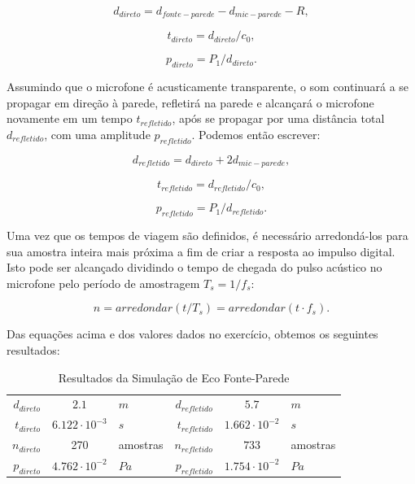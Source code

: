 \documentclass[a4paper,twoside,12pt]{article}
\begin{document}
	\begin{equation}
		d_{direto} = d_{fonte-parede} - d_{mic-parede} - R,
	\end{equation}
	
	\begin{equation}
		t_{direto} = d_{direto}/c_0,
	\end{equation}
	
	\begin{equation}
		p_{direto} = P_1/d_{direto}.
	\end{equation}
	
	Assumindo que o microfone é acusticamente transparente, o som continuará a se propagar em direção à parede, refletirá na parede e alcançará o microfone novamente em um tempo $t_{refletido}$, após se propagar por uma distância total $d_{refletido}$, com uma amplitude $p_{refletido}$. Podemos então escrever:
	
	\begin{equation}
		d_{refletido} = d_{direto} + 2 d_{mic-parede},
	\end{equation}
	
	\begin{equation}
		t_{refletido} = d_{refletido}/c_0,
	\end{equation}
	
	\begin{equation}
		p_{refletido} = P_1/d_{refletido}.
	\end{equation}
	
	Uma vez que os tempos de viagem são definidos, é necessário arredondá-los para sua amostra inteira mais próxima a fim de criar a resposta ao impulso digital. Isto pode ser alcançado dividindo o tempo de chegada do pulso acústico no microfone pelo período de amostragem $T_s = 1/f_s$:
	
	\begin{equation}
		n = arredondar(t/T_s) = arredondar(t \cdot f_s).
	\end{equation}
	
	Das equações acima e dos valores dados no exercício, obtemos os seguintes resultados:
	
	\begin{table}[h!]
		\centering
		\caption{Resultados da Simulação de Eco Fonte-Parede}
		\begin{tabular}{rcl|rcl}
			
			\hline
			$d_{direto}$	&	$2.1$ 	&	$m$ 				& $d_{refletido}$	&	$5.7$ 					& $m$ \\
			$t_{direto}$ 	&	$6.122 \cdot 10^{-3}$	&	$s$	& $t_{refletido}$	&	$1.662 \cdot 10^{-2}$ 	& $s$ \\
			$n_{direto}$ 	&	270		&	amostras 			& $n_{refletido}$	&	$733$ 					& amostras \\
			$p_{direto}$	&	$4.762 \cdot 10^{-2}$	&	$Pa$ & $p_{refletido}$	&	$1.754 \cdot 10^{-2}$ 	& $Pa$ \\
			\hline
		\end{tabular}
		\label{table:source_wall_results}
	\end{table}
	
\end{document}

